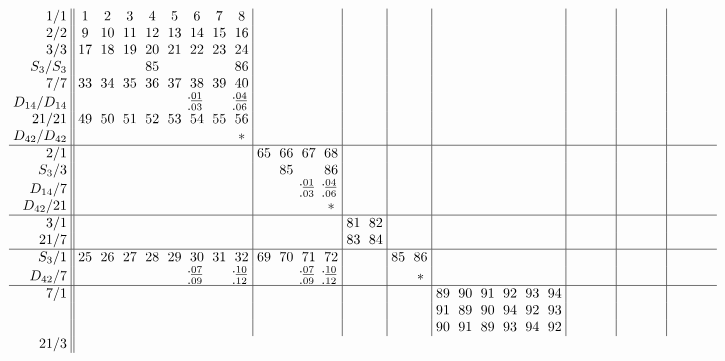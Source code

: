 \documentclass[12pt,a4paper]{amsart}
\begin{document}
\begin{align*}\arraycolsep3pt
\begin{array}{r||cccccccc|cccc|cc|cc|cccccc|cccccc|cccccc|cccccc}
1/1&
 1& 2& 3& 4& 5& 6& 7& 8&&&&&&&&&&&&&&&&&&&&&&&&&&&&&&&&\\
2/2&
 9&10&11&12&13&14&15&16&&&&&&&&&&&&&&&&&&&&&&&&&&&&&&&&\\
3/3&
17&18&19&20&21&22&23&24&&&&&&&&&&&&&&&&&&&&&&&&&&&&&&&&\\
S_3/S_3&
  &  &  &85&  &  &  &86&&&&&&&&&&&&&&&&&&&&&&&&&&&&&&&&\\
7/7&
33&34&35&36&37&38&39&40&&&&&&&&&&&&&&&&&&&&&&&&&&&&&&&&\\
D_{14}/D_{14}&
&&&&&^{\llap{.}\underline{01}}_{\llap{.}03}&&^{\llap{.}\underline{04}}_{\llap{.}06}&&&&&&&&&&&&&&&&&&&&&&&&&&&&&&\\
21/21&
49&50&51&52&53&54&55&56&&&&&&&&&&&&&&&&&&&&&&&&&&&&&&&&\\
D_{42}/D_{42}&
  &  &  &  &  &  &  & *&&&&&&&&&&&&&&&&&&&&&&&&&&&&&&&&\\ \hline
2/1&
  &  &  &  &  &  &  &  &65&66&67&68&&&&&&&&&&&&&&&&&&&&&&&&&&&&\\
S_3/3&
  &  &  &  &  &  &  &  &  &85&  &86&&&&&&&&&&&&&&&&&&&&&&&&&&&&\\
D_{14}/7
&&&&&&&&&&&^{\llap{.}\underline{01}}_{\llap{.}03}&^{\llap{.}\underline{04}}_{\llap{.}06}&&&&&&&&&&&&&&&&&&&&&&&&&&\\
D_{42}/21&
  &  &  &  &  &  &  &  &  &  &  & *&&&&&&&&&&&&&&&&&&&&&&&&&&&&\\ \hline
3/1&
  &  &  &  &  &  &  &  &  &  &  &  &81&82&&&&&&&&&&&&&&&&&&&&&&&&&&\\
21/7&
  &  &  &  &  &  &  &  &  &  &  &  &83&84&&&&&&&&&&&&&&&&&&&&&&&&&&\\ \hline
S_3/1&
25&26&27&28&29&30&31&32&69&70&71&72&  &  &85&86&&&&&&&&&&&&&&&&&&&&&&&&\\
D_{42}/7&
&&&&&^{\llap{.}\underline{07}}_{\llap{.}09}&&^{\llap{.}\underline{10}}_{\llap{.}12}&&&^{\llap{.}\underline{07}}_{\llap{.}09}&^{\llap{.}\underline{10}}_{\llap{.}12}&&&  & *&&&&&&&&&&&&&&&&&&&&&&&&\\ \hline
7/1&
  &  &  &  &  &  &  &  &  &  &  &  &  &  &&&89&90&91&92&93&94&&&&&&&&&&&&&&&&&&\\
&
  &  &  &  &  &  &  &  &  &  &  &  &  &  &&&91&89&90&94&92&93&&&&&&&&&&&&&&&&&&\\
&
  &  &  &  &  &  &  &  &  &  &  &  &  &  &&&90&91&89&93&94&92&&&&&&&&&&&&&&&&&&\\
21/3&

\end{array}
\end{align*}
\end{document}
